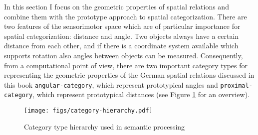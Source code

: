 In this section I focus on the geometric properties of spatial relations 
and combine them with the prototype approach to spatial categorization. 
There are two features of the sensorimotor space which are of particular
importance for spatial categorization: distance and angle. Two objects 
always have a certain distance from each other, and if there is a
coordinate system available which supports rotation also angles 
between objects can be measured. 
Consequently, from a computational point of view, there are two 
important category types for representing the geometric properties 
of the German spatial relations discussed in this book {\footnotesize\tt angular-category},\enlargethispage{1\baselineskip}
which represent prototypical angles and {\footnotesize\tt proximal-category},
which represent prototypical distances (see Figure \ref{f:category-hierarchy} for an overview).

\begin{figure}
\texttt{[image: figs/category-hierarchy.pdf]}
\caption[Category type hierarchy]{Category type hierarchy 
used in semantic processing}
\label{f:category-hierarchy}
\end{figure}

